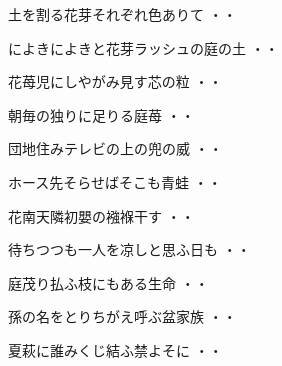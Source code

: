 \vspace{0.6cm}
\begin{shiika}土を割る花芽それぞれ色ありて
\hfill{・・}\end{shiika}
\vspace{0.6cm}
\begin{shiika}によきによきと花芽ラッシュの庭の土
\hfill{・・}\end{shiika}
\vspace{0.6cm}
\begin{shiika}花苺児にしやがみ見す芯の粒
\hfill{・・}\end{shiika}
\vspace{0.6cm}
\begin{shiika}朝毎の独りに足りる庭苺
\hfill{・・}\end{shiika}
\vspace{0.6cm}
\begin{shiika}団地住みテレビの上の兜の威
\hfill{・・}\end{shiika}
\vspace{0.6cm}
\begin{shiika}ホース先そらせばそこも青蛙
\hfill{・・}\end{shiika}
\vspace{0.6cm}
\begin{shiika}花南天隣初嬰の襁褓干す
\hfill{・・}\end{shiika}
\vspace{0.6cm}
\begin{shiika}待ちつつも一人を凉しと思ふ日も
\hfill{・・}\end{shiika}
\vspace{0.6cm}
\begin{shiika}庭茂り払ふ枝にもある生命
\hfill{・・}\end{shiika}
\vspace{0.6cm}
\begin{shiika}孫の名をとりちがえ呼ぶ盆家族
\hfill{・・}\end{shiika}
\vspace{0.6cm}
\begin{shiika}夏萩に誰みくじ結ふ禁よそに
\hfill{・・}\end{shiika}

